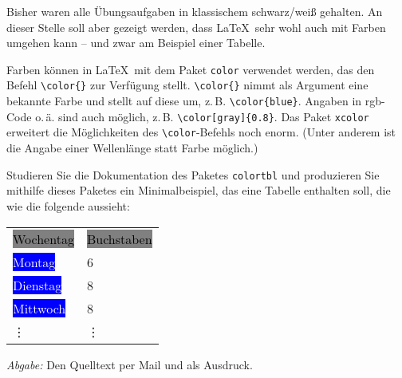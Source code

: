 \documentclass{scrartcl}
\newcommand{\abgabe}[1]{\par\noindent\textit{Abgabe:} #1}
\begin{document}
\begin{question}[subtitle=Bunte Tabelle]{6}
	Bisher waren alle Übungsaufgaben in klassischem schwarz/weiß gehalten. An dieser Stelle soll aber gezeigt werden, dass \LaTeX\ sehr wohl auch mit Farben umgehen kann – und zwar am Beispiel einer Tabelle.

	Farben können in \LaTeX\ mit dem Paket \verb|color| verwendet werden, das den Befehl \texttt{\textbackslash color\{\}} zur Verfügung stellt. \texttt{\textbackslash color\{\}} nimmt als Argument eine bekannte Farbe und stellt auf diese um, z.\,B. \texttt{\textbackslash color\{blue\}}. Angaben in rgb-Code o.\,ä. sind auch möglich, z.\,B. \texttt{\textbackslash color[gray]\{0.8\}}. Das Paket \verb|xcolor| erweitert die Möglichkeiten des \texttt{\textbackslash color}-Befehls noch enorm. (Unter anderem ist die Angabe einer Wellenlänge statt Farbe möglich.)

	Studieren Sie die Dokumentation des Paketes \verb|colortbl| und produzieren Sie mithilfe dieses Paketes ein Minimalbeispiel, das eine Tabelle enthalten soll, die wie die folgende aussieht: %

	\centering
	\begin{tabular}{l!{\hspace*{-4.3mm}}l}
		\colorbox{gray}{\textcolor{black}{Wochentag}} & \colorbox{gray}{\textcolor{black}{Buchstaben\vphantom{Wg}}}\\
		\colorbox{blue}{\textcolor{white}{Montag\hspace*{.8em}}} & 6 \\
		\colorbox{blue}{\textcolor{white}{Dienstag\hspace*{.34em}}} & 8\\
		\colorbox{blue}{\textcolor{white}{Mittwoch}} &  8\\
		\vdots & \vdots \\
	\end{tabular}

	\abgabe{Den Quelltext per Mail und als Ausdruck.}
\end{question}
\end{document}
